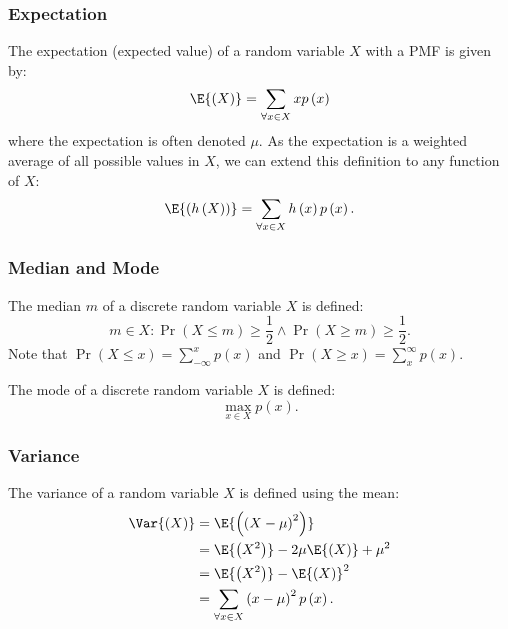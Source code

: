 \documentclass{article}
\begin{document}
\subsubsection{Expectation}
The expectation (expected value) of a random variable \(X\) with a PMF is given by:
\begin{equation*}
    \E{\left( X \right)} = \sum_{\forall x \in X} x p\left( x \right)
\end{equation*}
where the expectation is often denoted \(\mu\). As the expectation is a weighted average of all possible values in \(X\),
we can extend this definition to any function of \(X\):
\begin{equation*}
    \E{\left( h\left( X \right) \right)} = \sum_{\forall x \in X} h\left( x \right) p\left( x \right).
\end{equation*}
\subsubsection{Median and Mode}
The median \(m\) of a discrete random variable \(X\) is defined:
\begin{equation*}
    m \in X : \Pr{\left( X \leq m \right)} \geq \frac{1}{2} \land \Pr{\left( X \geq m \right)} \geq \frac{1}{2}.
\end{equation*}
Note that \(\Pr{\left( X \leq x \right)} = \sum_{-\infty}^x p\left( x \right)\) and \(\Pr{\left( X \geq x \right)} = \sum_x^\infty p\left( x \right)\).

The mode of a discrete random variable \(X\) is defined:
\begin{equation*}
    \max_{x \in X} p\left( x \right).
\end{equation*}
\subsubsection{Variance}
The variance of a random variable \(X\) is defined using the mean:
\begin{align*}
    \Var{\left( X \right)} & = \E{\left( \left( X - \mu \right)^2 \right)}                        \\
                           & = \E{\left( X^2 \right)} - 2 \mu \E{\left( X \right)} + \mu^2        \\
                           & = \E{\left( X^2 \right)} - \E{\left( X \right)}^2                    \\
                           & = \sum_{\forall x \in X} \left( x - \mu \right)^2 p\left( x \right).
\end{align*}
\end{document}
